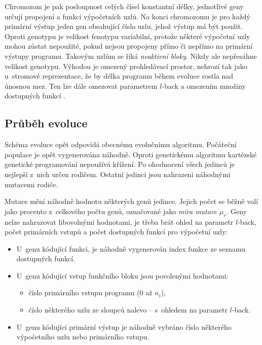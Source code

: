 Chromozom je pak posloupnost celých čísel konstantní délky, jednotlivé geny určují propojení a funkci výpočetních uzlů. Na konci chromozomu je pro každý primární výstup jeden gen obsahující číslo uzlu, jehož výstup má být použit. Oproti genotypu je velikost fenotypu variabilní, protože některé výpočetní uzly mohou zůstat nepoužité, pokud nejsou propojeny přímo či nepřímo na primární výstupy programu. Takovým uzlům se říká \emph{neaktivní bloky}. Nikdy ale nepřesáhne velikost genotypu. Výhodou je omezený prohledávací prostor, nehrozí tak jako u~stromové reprezentace, že by délka programu během evoluce rostla nad únosnou mez. Ten lze dále omezovat parametrem $l$-back a omezením množiny dostupných funkcí \cite{ZelenaCGP, Modra}.


\subsection{Průběh evoluce}
\label{secCGPEvo}

Schéma evoluce opět odpovídá obecnému evolučnímu algoritmu. Počáteční populace je opět vygenerována náhodně. Oproti genetickému algoritmu kartézské genetické programování nepoužívá křížení. Po ohodnocení všech jedinců je nejlepší z~nich určen rodičem. Ostatní jedinci jsou nahrazeni náhodnými mutacemi rodiče.

Mutace mění náhodně hodnotu některých genů jedince. Jejich počet se běžně volí jako procento z~celkového počtu genů, označované jako \emph{míra mutace} $\mu_r$. Geny nelze nahrazovat libovolnými hodnotami, je třeba brát ohled na parametr $l$-back, počet primárních vstupů a počet dostupných funkcí pro výpočetní uzly:

\begin{itemize}
    \item U~genu kódující funkci, je náhodně vygenerován index funkce ze seznamu dostupných funkcí.
    \item U~genu kódující vstup funkčního bloku jsou povolenými hodnotami:
        \begin{itemize}
            \item číslo primárního vstupu programu (0 až $n_i$),
            \item číslo některého uzlu ze sloupců nalevo -- s~ohledem na parametr $l$-back.
        \end{itemize}
    \item U~genu kódující primární výstup je náhodně vybráno číslo některého výpočetního uzlu nebo primárního vstupu.
\end{itemize}

